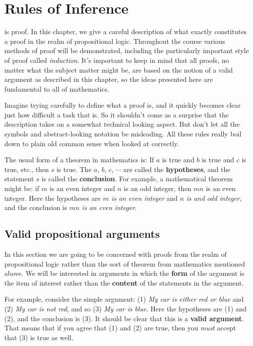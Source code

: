 \chapter{Rules of Inference}

 is proof. In this chapter, we give a careful
description of what exactly constitutes a proof in the realm of propositional 
logic. Throughout the course 
various methods of proof will be demonstrated, including the
particularly important style of proof called {\itshape induction}. It's important to 
keep in mind
that all proofs, no matter
what the subject matter might be, are based on the notion of a valid argument as 
described
in this chapter, so the ideas presented here are fundamental to all of mathematics.


Imagine
trying carefully to define what a proof is, and it quickly becomes clear just how
difficult a task that is.  So it shouldn't come as a surprise that the
description takes on a somewhat technical looking aspect.  But don't let all
the symbols and abstract{-}looking notation be misleading.  All these rules
really boil down to plain old common sense when looked at
correctly.

The usual form of a theorem in mathematics is: If $a$ is true and $b$ is
true and $c$ is true, etc., then $s$ is true. The $a$, $b$, $c$, $\cdots$ are called
the {\bfseries hypotheses}, and the statement $s$ is called the {\bfseries conclusion}. 
For example,
a mathematical theorem might be: if $m$ is an even integer and $n$ is an
odd integer, then $mn$ is an even integer.  Here the hypotheses are {\itshape $m$ is
an even integer} and {\itshape $n$ is and odd integer}, and the conclusion is 
{\itshape $mn$ is an even integer}.

\section{Valid propositional arguments}
In this section we are going to be concerned with proofs from the
realm of propositional logic rather than the sort of theorem from mathematics 
mentioned above.
We will be interested in arguments in which the {\bfseries form} of the argument is the
item of interest rather than the {\bfseries content} of the statements in the argument.

For example, consider the simple argument: 
(1) {\itshape My car is either red or blue}
and (2) {\itshape My car is not red}, and so 
(3) {\itshape My car is blue}.  Here the hypotheses
are (1) and (2), and the conclusion is (3). It should be clear that this is a 
{\bfseries valid argument}. That
means that if you agree that (1) and (2) are true, then you {\itshape must} accept that 
(3) is 
true as well.

